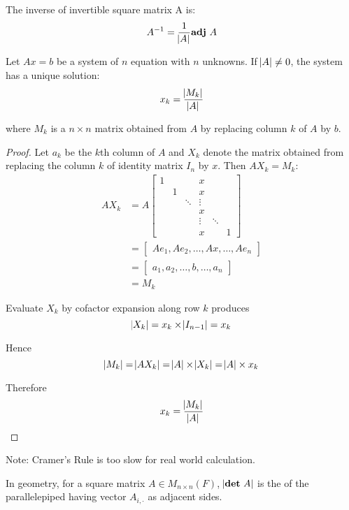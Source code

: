\begin{theorem}
    The inverse of invertible square matrix A is:
    \begin{equation*}
        A^{-1} = \frac{1}{\abs{A}} \displaystyle \mathbf{adj} ~\displaystyle A
    \end{equation*}
\end{theorem}


\begin{theorem}
	Let $Ax=b$ be a system of $n$ equation with $n$ unknowns. If $\abs{A} \neq 0$, the system has a unique solution:
	\begin{equation}
		x_k = \frac{\abs{M_k}}{\abs{A}}
	\end{equation}
	
	where $M_k$ is a $n\times n$ matrix obtained from $A$ by replacing column $k$ of $A$ by $b$.
\end{theorem}

\begin{proof}
	Let $a_k$ be the $k$th column of $A$ and $X_k$ denote the matrix obtained from replacing the column $k$ of identity matrix $I_n$ by $x$. Then $A X_k = M_k$:
	\begin{equation*}
	\begin{aligned}
        A X_k &= A \begin{bmatrix}
			1 &   &   & x &   \\
			 & 1 &  & x &   \\
			 && \ddots &  \vdots \\
			&&& x & \\
			&&& \vdots & \ddots \\
			&&& x&   & 1 
		\end{bmatrix} \\
		&= \begin{bmatrix}
		    Ae_1, Ae_2, \dots, Ax, \dots, Ae_n
		\end{bmatrix} \\
		& = \begin{bmatrix}
		    a_1, a_2, \dots, b, \dots, a_n
		\end{bmatrix} \\
		&= M_k
		\end{aligned}
    \end{equation*}
	
	
	Evaluate $X_k$ by cofactor expansion along row $k$ produces
	\begin{equation*}
		\abs{X_k} = x_k \times \abs{I_{n-1}} = x_k
	\end{equation*}
	
	Hence 
	\begin{equation*}
		\abs{M_k} = \abs{A X_k} = \abs{A} \times \abs{X_k} = \abs{A} \times x_k
	\end{equation*}
	
	Therefore
	\begin{equation*}
		x_k = \frac{\abs{M_k}}{\abs{A}}
	\end{equation*}
\end{proof}

Note: Cramer's Rule is too slow for real world calculation.

\begin{theorem}
	In geometry, for a square matrix $A \in M_{n\times n}(F)$, $\abs{\displaystyle \mathbf{det} ~\displaystyle A}$ is the  of the parallelepiped having vector $A_{i,\cdot}$ as adjacent sides.
\end{theorem}


